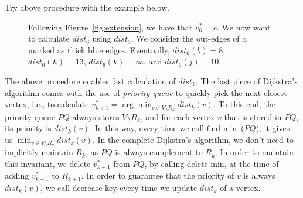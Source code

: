 \begin{minipage}{0.8\textwidth}
	\xxx
	\xxx
	\xxx
	\xxx
	\xxx
	\xxx
	\xxx
\end{minipage}

Try above procedure with the example below.

\begin{figure}[h!]
\centering{}
\caption{Following Figure~\ref{fig:extension}, we have that $v_6^* = c$.
We now want to calculate $dist_6$ using $dist_5$. We consider the out-edges of $c$, marked as thick blue edges.
Eventually, $dist_6(b) = 8$, $dist_6(h) = 13$, $dist_6(k) = \infty$, and $dist_6(j) = 10$.  }
\label{fig:update}
\end{figure}

The above procedure enables fast calculation of $dist_k$.
The last piece of Dijkstra's algorithm comes with the use of \emph{priority queue}
to quickly pick the next closest vertex, i.e., to calculate $v_{k+1}^* = \arg\min_{v\in V\setminus R_k} dist_k(v)$.
To this end, the priority queue $PQ$ always stores $V\setminus R_k$,
and for each vertex $v$ that is stored in $PQ$, its priority is $dist_k(v)$.
In this way, every time we call find-min~($PQ$), it gives us $\min_{v\in V\setminus R_k} dist_k(v)$.
In the complete Dijkstra's algorithm, we don't need to implicitly maintain $R_k$,
as $PQ$ is always complement to $R_k$.
In order to maintain this invariant, we delete $v_{k+1}^*$ from $PQ$, by calling delete-min, at the time of adding $v_{k+1}^*$ to $R_{k+1}$.
In order to guarantee that the priority of $v$ is always $dist_k(v)$,
we call decrease-key every time we update $dist_k$ of a vertex.

\begin{minipage}{0.8\textwidth}
	\xxx
	\xxx
	\xxx
	\xxx
	\xxx
	\xxx
	\xxx
	\xxx
	\xxx
	\xxx
	\xxx
	\xxx
	\xxx
	\xxx
	\xxx
	\xxx
	\xxx
\end{minipage}

